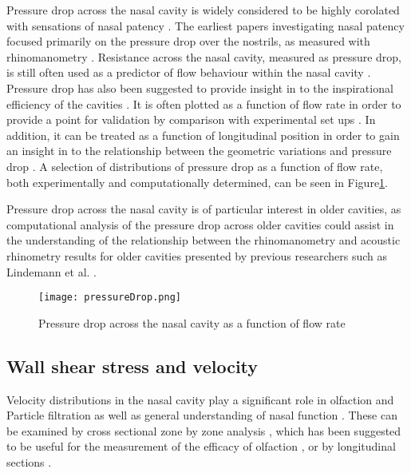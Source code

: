 Pressure drop across the nasal cavity is widely considered to be highly corolated with sensations of nasal patency \cite{Ottaviano2016}.
The earliest papers investigating nasal patency focused primarily on the pressure drop over the nostrils, as measured with rhinomanometry \cite{Martin1981}. 
Resistance across the nasal cavity, measured as pressure drop, is still often used as a predictor of flow behaviour within the nasal cavity \cite{Edelstein1996, Lindemann2008, WhanKim2007}. 
Pressure drop has also been suggested to provide insight in to the inspirational efficiency of the cavities \cite{Lintermann2013}. 
It is often plotted as a function of flow rate in order to provide a point for validation by comparison with experimental set ups \cite{Wen2008, Inthavong2014}. 
In addition, it can be treated as a function of longitudinal position in order to gain an insight in to the relationship between the geometric variations and pressure drop \cite{Lintermann2013}. 
A selection of distributions of pressure drop as a function of flow rate, both experimentally and computationally determined, can be seen in Figure\ref{fig:pvf}. 

Pressure drop across the nasal cavity is of particular interest in older cavities, as computational analysis of the pressure drop across older cavities could assist in the understanding of the relationship between the rhinomanometry and acoustic rhinometry results for older cavities presented by previous researchers such as Lindemann et al. \cite{Lindemann2008}.

\begin{figure}
  \centering
  \texttt{[image: pressureDrop.png]}
  \caption{Pressure drop across the nasal cavity as a function of flow rate} \label{fig:pvf}
\centering
\end{figure}

 \subsection{Wall shear stress and velocity}

Velocity distributions in the nasal cavity play a significant role in olfaction \cite{Ishikawa2009} and Particle filtration \cite{Inthavong2006, Wang2009a} as well as general understanding of nasal function \cite{Keyhani1995, Zhu2011, Lintermann2013}. 
These can be examined by cross sectional zone by zone analysis \cite{Keyhani1995, Zhu2011}, which has been suggested to be useful for the measurement of the efficacy of olfaction \cite{Zhu2011}, or by longitudinal sections \cite{Lintermann2013,Taylor2010}. 

